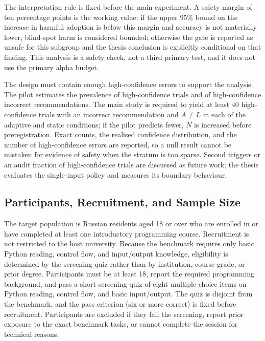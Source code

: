 \documentclass[oneside,final,14pt,a4paper]{extreport}
\begin{document}
The interpretation rule is fixed before the main experiment. A safety margin of
ten percentage points is the working value: if the upper 95\% bound on the
increase in harmful adoption is below this margin and accuracy is not materially
lower, blind-spot harm is considered bounded; otherwise the gate is reported as
unsafe for this subgroup and the thesis conclusion is explicitly conditional on
that finding. This analysis is a safety check, not a third primary test, and it
does not use the primary alpha budget.

The design must contain enough high-confidence errors to support the analysis.
The pilot estimates the prevalence of high-confidence trials and of
high-confidence incorrect recommendations. The main study is required to yield
at least 40 high-confidence trials with an incorrect recommendation and
$A\neq L$ in each of the adaptive and static conditions; if the pilot predicts
fewer, $N$ is increased before preregistration. Exact counts, the realised confidence
distribution, and the number of high-confidence errors are reported, so a null
result cannot be mistaken for evidence of safety when the stratum is too sparse.
Second triggers or an audit fraction of high-confidence trials are discussed as
future work; the thesis evaluates the single-input policy and measures its
boundary behaviour.

\subsection{Participants, Recruitment, and Sample Size}
\label{subsec:participants}

The target population is Russian residents aged 18 or over who are enrolled in
or have completed at least one introductory programming course. Recruitment is
not restricted to the host university. Because the benchmark requires only basic
Python reading, control flow, and input/output knowledge, eligibility is
determined by the screening quiz rather than by institution, course grade, or
prior degree. Participants must be at least 18, report the required programming
background, and pass a short screening quiz of eight multiple-choice items on
Python reading, control flow, and basic input/output. The quiz is disjoint from
the benchmark, and the pass criterion (six or more correct) is fixed before
recruitment. Participants are excluded if they fail the screening, report prior
exposure to the exact benchmark tasks, or cannot complete the session for
technical reasons.
\end{document}
